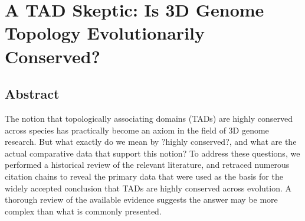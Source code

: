 \chapter{A TAD Skeptic: Is 3D Genome Topology Evolutionarily Conserved?}\label{ch:ch03}

\section[Abstract]{Abstract\footnotemark}

The notion that topologically associating domains (TADs) are highly conserved across species has practically become an axiom in the field of 3D genome research. But what exactly do we mean by ?highly conserved?, and what are the actual comparative data that support this notion? To address these questions, we performed a historical review of the relevant literature, and retraced numerous citation chains to reveal the primary data that were used as the basis for the widely accepted conclusion that TADs are highly conserved across evolution. A thorough review of the available evidence suggests the answer may be more complex than what is commonly presented.


